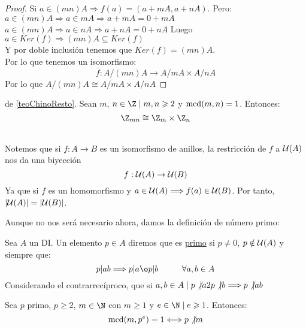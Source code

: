 \begin{teo}
\begin{proof}
    \bigskip
    
    Si $a \in (mn)A \Longrightarrow f(a) = (a+mA, a+nA)$. Pero:\newline
    $a \in (mn)A \Longrightarrow a \in mA \Longrightarrow a+mA = 0+mA$\newline
    $a \in (mn)A \Longrightarrow a\in nA \Longrightarrow a+nA = 0+nA$\newline
    Luego $a \in Ker(f) \Longrightarrow (mn)A \subseteq Ker(f)$\\

    
    Y por doble inclusión tenemos que $Ker(f) = (mn)A$.\\

    
    Por lo que tenemos un isomorfismo:
    $$\overline{f}:A/(mn)A\rightarrow A/mA\times A/nA$$
    Por lo que $A/(mn)A \cong A/mA\times A/nA$
\end{proof}
\end{teo}


\begin{coro}
    de \ref{teoChinoResto}.\newline
    Sean $m$, $n \in \Z \mid m,n \geq 2$ y $\operatorname{mcd}(m,n) = 1$. Entonces:
    $$\Z_{mn} \cong \Z_m \times \Z_n$$
\end{coro}~\\

Notemos que si $f:A\rightarrow B$ es un isomorfismo de anillos, la restricción de $f$ a $\mathcal{U}(A)$ nos da una biyección
$$f:\mathcal{U}(A)\rightarrow \mathcal{U}(B)$$
Ya que si $f$ es un homomorfismo y $a \in \mathcal{U}(A) \Longrightarrow f(a) \in \mathcal{U}(B)$.\newline
Por tanto, $|\mathcal{U}(A)| = |\mathcal{U}(B)|$.

\bigskip

Aunque no nos será necesario ahora, damos la definición de número primo:
\begin{definicion}[Primo]
    \label{defPrimo}
    Sea $A$ un DI. Un elemento $p \in A$ diremos que es \underline{primo} si $p \neq 0$, $p \notin \mathcal{U}(A)$ y siempre que:
    $$p|ab \Longrightarrow p|a \o p|b\hspace{1cm}\forall a,b \in A$$
    Considerando el contrarrecíproco, que si $a,b \in A \mid p\not|a 2 p\not|b \Longrightarrow p\not|ab$
\end{definicion}

\begin{lema}
    \label{lemaParaPropEuler}
    Sea $p$ primo, $p\geq 2$, $m \in \N$ con $m \geq 1$ y $e \in \N \mid e \geq 1$. Entonces:
    $$\operatorname{mcd}(m,p^e) = 1 \Longleftrightarrow p\not|m$$
\end{lema}

